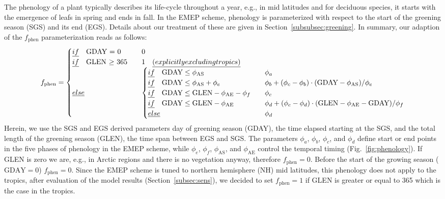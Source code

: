 \documentclass[gmd, manuscript]{copernicus}
\begin{document}
The phenology of a plant typically describes its life-cycle throughout a year, e.g., in mid latitudes and for deciduous species, it starts with the emergence of leafs in spring and ends in fall. In the EMEP scheme, phenology is parameterized with respect to the start of the greening season (SGS) and its end (EGS). Details about our treatment of these are given in Section~\ref{subsubsec:greening}. In summary, our adaption of the $f_\text{phen}$ parameterization reads as follows:
%
\begin{equation}
  f_\text{phen} =
  \begin{cases}
    \emph{if} \quad \text{GDAY = 0}  & \quad 0 \\
    \emph{if} \quad \text{GLEN $\ge$ 365} & \quad 1 \quad \emph{(explicitly excluding tropics)} \\
    \emph{else}  & \quad 
    \begin{cases}
      \emph{if} \quad \text{GDAY} \le \phi_\text{AS}  & \quad \phi_a \\
      \emph{if} \quad \text{GDAY} \le \phi_\text{AS} + \phi_e  & \quad \phi_b+(\phi_c-\phi_b)\cdot(\text{GDAY}-\phi_\text{AS})/\phi_e\\
      \emph{if} \quad \text{GDAY} \le \text{GLEN} - \phi_\text{AE} - \phi_f  & \quad \phi_c\\
      \emph{if} \quad \text{GDAY} \le \text{GLEN} - \phi_\text{AE}  & \quad \phi_d+(\phi_c-\phi_d)\cdot(\text{GLEN}-\phi_\text{AE}-\text{GDAY})/\phi_f\\
      \emph{else} & \quad \phi_d
    \end{cases}
  \end{cases}
  \label{eq:fphen}
\end{equation}
%
Herein, we use the SGS and EGS derived parameters day of greening season (GDAY), the time elapsed starting at the SGS, and the total length of the greening season (GLEN), the time span between EGS and SGS. The parameters $\phi_a$, $\phi_b$, $\phi_c$, and $\phi_d$ define start or end points in the five phases of phenology in the EMEP scheme, while $\phi_e$, $\phi_f$, $\phi_\text{AS}$, and $\phi_\text{AE}$ control the temporal timing (Fig.~\ref{fig:phenology}). If GLEN is zero we are, e.g., in Arctic regions and there is no vegetation anyway, therefore $f_\text{phen}=0$. Before the start of the growing season ($\text{GDAY}=0$) $f_\text{phen}=0$. Since the EMEP scheme is tuned to northern hemisphere (NH) mid latitudes, this phenology does not apply to the tropics, after evaluation of the model results (Section~\ref{subsec:sens}), we decided to set $f_\text{phen}=1$ if GLEN is greater or equal to 365 which is the case in the tropics.
\end{document}
